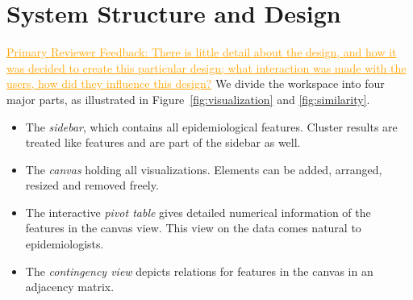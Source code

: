 \documentclass[journal]{style/vgtc} 			          %
\newcommand{\com}[1]{\textcolor{orange}{\uline{#1}}}
\begin{document}
\section{System Structure and Design} \label{Structure and Workflow}
\com{Primary Reviewer Feedback: There is little detail about the design, and how it was decided to create this particular design; what interaction was made with the users, how did they influence this design?}
We divide the workspace into four major parts, as illustrated in Figure~\ref{fig:visualization} and \ref{fig:similarity}.
\begin{itemize}
	\item The \emph{sidebar}, which contains all epidemiological features. Cluster results are treated like features and are part of the sidebar as well.
	\item The \emph{canvas} holding all visualizations. Elements can be added, arranged, resized and removed freely.
	\item The interactive \emph{pivot table} gives detailed numerical information of the features in the canvas view. This view on the data comes natural to epidemiologists.
	\item The \emph{contingency view} depicts relations for features in the canvas in an adjacency matrix.
\end{itemize}
%
% 
% 
\end{document}
